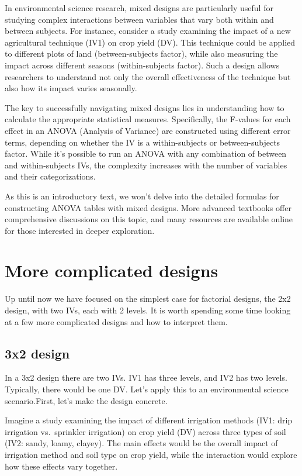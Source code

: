 \documentclass[
  letterpaper,
  DIV=11,
  numbers=noendperiod]{scrreprt}
\begin{document}
In environmental science research, mixed designs are particularly useful
for studying complex interactions between variables that vary both
within and between subjects. For instance, consider a study examining
the impact of a new agricultural technique (IV1) on crop yield (DV).
This technique could be applied to different plots of land
(between-subjects factor), while also measuring the impact across
different seasons (within-subjects factor). Such a design allows
researchers to understand not only the overall effectiveness of the
technique but also how its impact varies seasonally.

The key to successfully navigating mixed designs lies in understanding
how to calculate the appropriate statistical measures. Specifically, the
F-values for each effect in an ANOVA (Analysis of Variance) are
constructed using different error terms, depending on whether the IV is
a within-subjects or between-subjects factor. While it's possible to run
an ANOVA with any combination of between and within-subjects IVs, the
complexity increases with the number of variables and their
categorizations.

As this is an introductory text, we won't delve into the detailed
formulas for constructing ANOVA tables with mixed designs. More advanced
textbooks offer comprehensive discussions on this topic, and many
resources are available online for those interested in deeper
exploration.

\section{More complicated designs}\label{more-complicated-designs}

Up until now we have focused on the simplest case for factorial designs,
the 2x2 design, with two IVs, each with 2 levels. It is worth spending
some time looking at a few more complicated designs and how to interpret
them.

\subsection{3x2 design}\label{x2-design}

In a 3x2 design there are two IVs. IV1 has three levels, and IV2 has two
levels. Typically, there would be one DV. Let's apply this to an
environmental science scenario.First, let's make the design concrete.

Imagine a study examining the impact of different irrigation methods
(IV1: drip irrigation vs.~sprinkler irrigation) on crop yield (DV)
across three types of soil (IV2: sandy, loamy, clayey). The main effects
would be the overall impact of irrigation method and soil type on crop
yield, while the interaction would explore how these effects vary
together.
\end{document}

